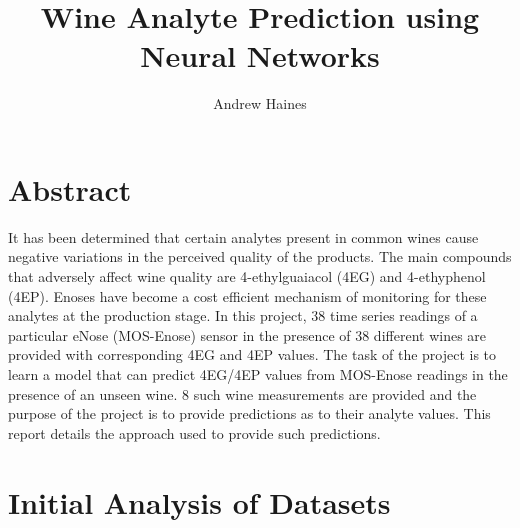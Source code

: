 \documentclass[twocolumn]{article}
\author{Andrew Haines}
\title{Wine Analyte Prediction using Neural Networks}
\begin{document}
\maketitle
\section{Abstract}

It has been determined that certain analytes present in common wines cause negative variations in the perceived
quality of the products. The main compounds that adversely affect wine quality are 4-ethylguaiacol (4EG) and
4-ethyphenol (4EP). Enoses have become a cost efficient mechanism of monitoring for these analytes at the production
stage\cite{wineSpoilage}. In this project, 38 time series readings of a particular eNose (MOS-Enose) sensor in the presence 
of 38 different wines are provided with corresponding 4EG and 4EP values. The task of the project is to learn
a model that can predict 4EG/4EP values from MOS-Enose readings in the presence of an unseen wine. 8 such wine
measurements are provided and the purpose of the project is to provide predictions as to their analyte values.
This report details the approach used to provide such predictions.

\section{Initial Analysis of Datasets}
\end{document}
